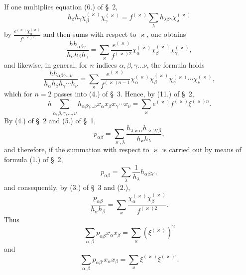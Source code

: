 \documentclass[11pt]{article}
\begin{document}
If one multiplies equation (6.) of \S~2,
\[
h_\beta h_\gamma\chi_\beta^{(\varkappa)}\chi_\gamma^{(\varkappa)}=f^{(\varkappa)}\sum_\lambda h_{\lambda\beta\gamma}\chi_\lambda^{(\varkappa)}
\]
by $\frac{e^{(\varkappa)}\chi_\alpha^{(\varkappa)}}{f^{(\varkappa)2}}$ and then sums with respect to $\varkappa$, one obtains
\begin{equation*}\tag{1.}
\frac{h h_{\alpha\beta\gamma}}{h_\alpha h_\beta h_\gamma}=\sum_\varkappa \frac{e^{(\varkappa)}}{f^{(\varkappa)2}}\chi_\alpha^{(\varkappa)}\chi_\beta^{(\varkappa)}\chi_\gamma^{(\varkappa)},
\end{equation*}
and likewise, in general, for $n$ indices $\alpha,\beta,\gamma\ldots\nu$, the formula holds
\begin{equation*}\tag{2.}
\frac{h h_{\alpha\beta\gamma\ldots\nu}}{h_\alpha h_\beta h_\gamma\cdots h_\nu}
=\sum_\varkappa \frac{e^{(\varkappa)}}{f^{(\varkappa)n-1}}\chi_\alpha^{(\varkappa)}\chi_\beta^{(\varkappa)}\chi_\gamma^{(\varkappa)}\cdots\chi_\nu^{(\varkappa)},
\end{equation*}
which for $n=2$ passes into (4.) of \S~3. Hence, by (11.) of \S~2,
\begin{equation*}\tag{3.}
h\sum_{\alpha,\beta,\gamma,\ldots,\nu}h_{\alpha\beta\gamma\ldots\nu}x_\alpha x_\beta x_\gamma\cdots x_\nu=\sum_\varkappa e^{(\varkappa)}f^{(\varkappa)}\xi^{(\varkappa)n}.
\end{equation*}
By (4.) of \S~2 and (5.) of \S~1,
\[
p_{\alpha\beta}=\sum_{\varkappa,\lambda}\frac{h_{\lambda\varkappa\alpha}h_{\varkappa'\lambda'\beta}}{h_\varkappa h_\lambda},
\]
and therefore, if the summation with respect to $\varkappa$ is carried out by means of formula (1.) of \S~2,
\begin{equation*}\tag{4.}
p_{\alpha\beta}=\sum_\lambda \frac{1}{h_\lambda}h_{\alpha\beta\lambda'},
\end{equation*}
and consequently, by (3.) of \S~3 and (2.),
\begin{equation*}\tag{5.}
\frac{p_{\alpha\beta}}{h_\alpha h_\beta}=\sum_\varkappa \frac{\chi_\alpha^{(\varkappa)}\chi_\beta^{(\varkappa)}}{f^{(\varkappa)2}}.
\end{equation*}
Thus
\begin{equation*}\tag{6.}
\sum_{\alpha,\beta}p_{\alpha\beta}x_\alpha x_\beta=\sum_\varkappa(\xi^{(\varkappa)})^2
\end{equation*}
and
\begin{equation*}\tag{7.}
\sum_{\alpha,\beta}p_{\alpha\beta'}x_\alpha x_\beta=\sum_\varkappa \xi^{(\varkappa)}\xi^{(\varkappa)'}.
\end{equation*}
\end{document}
